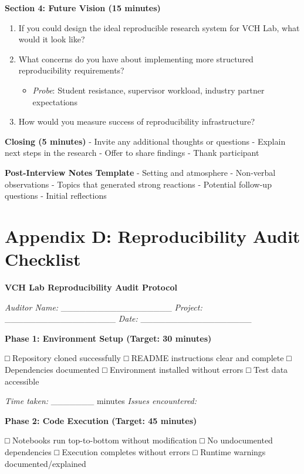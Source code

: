 \documentclass[
  oneside,
  open=any]{scrbook}
\providecommand{\tightlist}{%
  \setlength{\itemsep}{0pt}\setlength{\parskip}{0pt}}\usepackage{longtable,booktabs,array}
\begin{document}
\textbf{Section 4: Future Vision (15 minutes)}

\begin{enumerate}
\def\labelenumi{\arabic{enumi}.}
\setcounter{enumi}{11}
\item
  If you could design the ideal reproducible research system for VCH
  Lab, what would it look like?
\item
  What concerns do you have about implementing more structured
  reproducibility requirements?

  \begin{itemize}
  \tightlist
  \item
    \emph{Probe}: Student resistance, supervisor workload, industry
    partner expectations
  \end{itemize}
\item
  How would you measure success of reproducibility infrastructure?
\end{enumerate}

\textbf{Closing (5 minutes)} - Invite any additional thoughts or
questions - Explain next steps in the research - Offer to share findings
- Thank participant

\textbf{Post-Interview Notes Template} - Setting and atmosphere -
Non-verbal observations - Topics that generated strong reactions -
Potential follow-up questions - Initial reflections

\section{Appendix D: Reproducibility Audit
Checklist}\label{appendix-d-reproducibility-audit-checklist}

\textbf{VCH Lab Reproducibility Audit Protocol}

\emph{Auditor Name:} \_\_\_\_\_\_\_\_\_\_\_\_\_\_\_\_\_\_
\emph{Project:} \_\_\_\_\_\_\_\_\_\_\_\_\_\_\_\_\_\_ \emph{Date:}
\_\_\_\_\_\_\_\_\_\_\_\_\_\_\_\_\_\_

\textbf{Phase 1: Environment Setup (Target: 30 minutes)}

□ Repository cloned successfully □ README instructions clear and
complete □ Dependencies documented □ Environment installed without
errors □ Test data accessible

\emph{Time taken:} \_\_\_\_\_\_\_ minutes \emph{Issues encountered:}

\textbf{Phase 2: Code Execution (Target: 45 minutes)}

□ Notebooks run top-to-bottom without modification □ No undocumented
dependencies □ Execution completes without errors □ Runtime warnings
documented/explained
\end{document}
